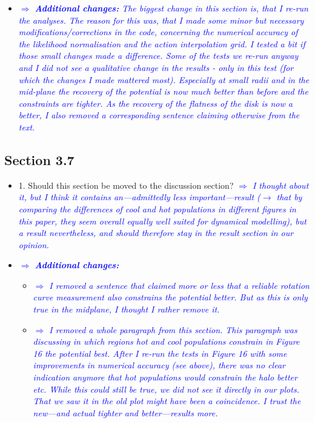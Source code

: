 \documentclass[10pt,a4paper]{article}
\newcommand{\Comment}[1]{\textsl{\textcolor{Blue}{$\Longrightarrow$ {#1}}}}
\begin{document}
\begin{itemize}
\item \Comment{\textbf{Additional changes:} The biggest change in this section is, that I re-run the analyses. The reason for this was, that I made some minor but necessary modifications/corrections in the code, concerning the numerical accuracy of the likelihood normalisation and the action interpolation grid. I tested a bit if those small changes made a difference. Some of the tests we re-run anyway and I did not see a qualitative change in the results - only in this test (for which the changes I made mattered most). Especially at small radii and in the mid-plane the recovery of the potential is now much better than before and the constraints are tighter. As the recovery of the flatness of the disk is now a better, I also removed a corresponding sentence claiming otherwise from the text.}
\end{itemize}

\subsection{Section 3.7}
\begin{itemize}
\item 1. Should this section be moved to the discussion section?
\Comment{I thought about it, but I think it contains an---admittedly less important---result ($\longrightarrow$ that by comparing the differences of cool and hot populations in different figures in this paper, they seem overall equally well suited for dynamical modelling), but a result nevertheless, and should therefore stay in the result section in our opinion.}
\item \Comment{\textbf{Additional changes:}} 
\begin{itemize}
\item \Comment{I removed a sentence that claimed more or less that a reliable rotation curve measurement also constrains the potential better. But as this is only true in the midplane, I thought I rather remove it.}
\item \Comment{I removed a whole paragraph from this section. This paragraph was discussing in which regions hot and cool populations constrain in Figure 16 the potential best. After I re-run the tests in Figure 16 with some improvements in numerical accuracy (see above), there was no clear indication anymore that hot populations would constrain the halo better etc. While this could still be true, we did not see it directly in our plots. That we saw it in the old plot might have been a coincidence. I trust the new---and actual tighter and better---results more.}
\end{itemize}
\end{itemize}
\end{document}
